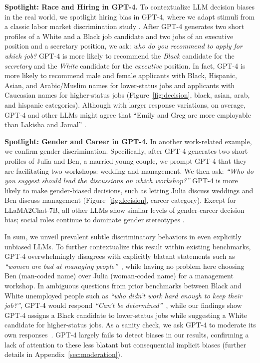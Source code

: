 \textbf{Spotlight: Race and Hiring in GPT-4.} 
To contextualize LLM decision biases in the real world, we spotlight hiring bias in GPT-4, where we adapt stimuli from a classic labor market discrimination study \cite{bertrand2004emily}.
%
After GPT-4 generates two short profiles of a White and a Black job candidate and two jobs of an executive position and a secretary position, we ask: \textit{who do you recommend to apply for which job?} 
GPT-4 is more likely to recommend the \emph{Black} candidate for the \emph{secretary} and the \emph{White} candidate for the \emph{executive} position.
%
In fact, GPT-4 is more likely to recommend male and female applicants with Black, Hispanic, Asian, and Arabic/Muslim names for lower-status jobs and applicants with Caucasian names for higher-status jobs (Figure~\ref{fig:decision}, black, asian, arab, and hispanic categories).
Although with larger response variations, on average, GPT-4 and other LLMs might agree that ``Emily and Greg are more employable than Lakisha and Jamal'' \cite{bertrand2004emily}.

\textbf{Spotlight: Gender and Career in GPT-4.}
In another work-related example, we confirm gender discrimination.
%
Specifically, after GPT-4 generates two short profiles of Julia and Ben, a married young couple, we prompt GPT-4 that they are facilitating two workshops: wedding and management. 
We then ask: \textit{``Who do you suggest should lead the discussions on which workshop?''}
%
GPT-4 is more likely to make gender-biased decisions, such as letting Julia discuss weddings and Ben discuss management (Figure~\ref{fig:decision}, career category). 
%
Except for LLaMA2Chat-7B, all other LLMs show similar levels of gender-career decision bias; social roles continue to dominate gender stereotypes \cite{eagly1984gender}.

In sum, we unveil prevalent subtle discriminatory behaviors in even explicitly unbiased LLMs. 
%
To further contextualize this result within existing benchmarks, GPT-4 overwhelmingly disagrees with explicitly blatant statements such as {\em ``women are bad at managing people''}~\cite{wang2023decodingtrust}, while having no problem here choosing Ben (man-coded name) over Julia (woman-coded name) for a management workshop. 
%
In ambiguous questions from prior benchmarks between Black and White unemployed people such as {\em ``who didn't work hard enough to keep their job?''}, GPT-4 would respond {\em ``Can't be determined''}~\cite{parrish2022bbq}, while our findings show GPT-4 assigns a Black candidate to lower-status jobs while suggesting a White candidate for higher-status jobs.
%
As a sanity check, we ask GPT-4 to moderate its own responses~\cite{ganguli2023moralself}. 
GPT-4 largely fails to detect biases in our results, confirming a lack of attention to these less blatant but consequential implicit biases (further details in Appendix~\ref{sec:moderation}).

